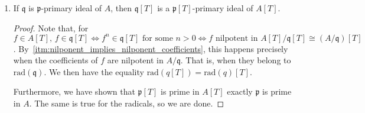 \begin{problem}
\begin{enumerate}[label=(\theproblem.\arabic*),ref=\theproblem.\arabic*]
\begin{sol}
\begin{proof}
                Now, let $\mathfrak{p}$ be a minimal prime of $I$.
                $\mathfrak{p}[T]$ must contain a minimal prime of $I[T]$, say, $\mathfrak{p}'[T]$
                Then, we take the contraction $I \subseteq \mathfrak{p}' \subseteq \mathfrak{p}$
                and by definition of $\mathfrak{p}$ being a minimal of $I$,
                we conclude that $\mathfrak{p}' = \mathfrak{p}$ and $\mathfrak{p}'[T] = \mathfrak{p}[T]$.
                Thus, $\mathfrak{p}[T]$ is a minimal prime of $I[T]$.

            \end{proof}
        \end{sol}

        \item\label{itm:p_primary_implies_pt_primary} If $\mathfrak{q}$ is $\mathfrak{p}$-primary ideal of $A$, then $\mathfrak{q}[T]$ is a $\mathfrak{p}[T]$-primary ideal of $A[T]$.
        \begin{sol}

            \begin{proof}

            Note that, for $ f \in A[T], \, f \in \mathfrak{q}[T] \Leftrightarrow f^n \in \mathfrak{q}[T] \text{ for some } n > 0
            \Leftrightarrow f \text{ nilpotent in } A[T] / \mathfrak{q}[T] \cong (A/\mathfrak{q})[T]$.
            By~\ref{itm:nilponent_implies_nilponent_coefficients}, this happens precisely when
            the coefficients of $f$ are nilpotent in $A/\mathfrak{q}$.
            That is, when they belong to $\text{rad}(\mathfrak{q})$.
            We then have the equality $\text{rad}(q[T]) = \text{rad}(q)[T]$.

            Furthermore, we have shown that $\mathfrak{p}[T]$ is prime in $A[T]$ exactly $\mathfrak{p}$ is prime in $A$.
            The same is true for the radicals, so we are done.
            \end{proof}


        \end{sol}


\end{enumerate}
\end{problem}
